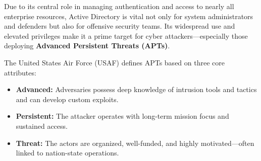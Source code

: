 Due to its central role in managing authentication and access to nearly all enterprise resources, Active Directory is vital not only for system administrators and defenders but also for offensive security teams. Its widespread use and elevated privileges make it a prime target for cyber attackers—especially those deploying \textbf{Advanced Persistent Threats (APTs)}.

The United States Air Force (USAF) defines APTs based on three core attributes:

\begin{itemize}
    \item \textbf{Advanced:} Adversaries possess deep knowledge of intrusion tools and tactics and can develop custom exploits.
    \item \textbf{Persistent:} The attacker operates with long-term mission focus and sustained access.
    \item \textbf{Threat:} The actors are organized, well-funded, and highly motivated—often linked to nation-state operations.
\end{itemize}

